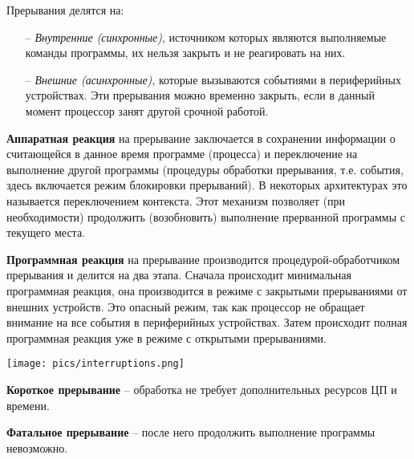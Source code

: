 Прерывания делятся на:
\begin{itemize}
    \item[--] \textit{Внутренние (синхронные)}, источником которых являются выполняемые команды программы, их нельзя закрыть и не реагировать на них.
    \item[--] \textit{Внешние (асинхронные)}, которые вызываются событиями в периферийных устройствах. Эти прерывания можно временно закрыть, если в данный момент процессор занят другой срочной работой.
\end{itemize}
    
\textbf{Аппаратная реакция} на прерывание заключается в сохранении информации о считающейся в данное время программе (процесса) и переключение на выполнение другой программы (процедуры обработки прерывания, т.е. события, здесь включается режим блокировки прерываний). В некоторых архитектурах это называется переключением контекста. Этот механизм позволяет (при необходимости) продолжить (возобновить) выполнение прерванной программы с текущего места.

\textbf{Программная реакция} на прерывание производится процедурой-обработчиком прерывания и делится на два этапа. Сначала происходит минимальная программная реакция, она производится в режиме с закрытыми прерываниями от внешних устройств. Это опасный режим, так как процессор не обращает внимание на все события в периферийных устройствах. Затем происходит полная программная реакция уже в режиме с открытыми прерываниями.

\texttt{[image: pics/interruptions.png]}

\textbf{Короткое прерывание} -- обработка не требует дополнительных ресурсов ЦП и времени.

\textbf{Фатальное прерывание} -- после него продолжить выполнение программы невозможно.



